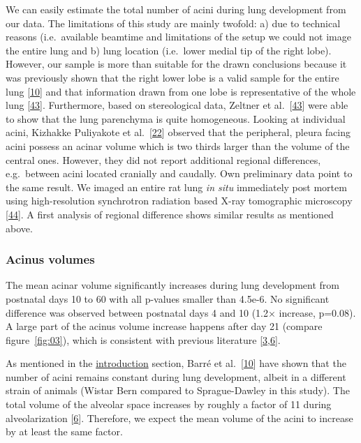 \documentclass[
  american,
]{article}
\begin{document}
We can easily estimate the total number of acini during lung development from our data.
The limitations of this study are mainly twofold: a) due to technical reasons (i.e.~available beamtime and limitations of the setup we could not image the entire lung and b) lung location (i.e.~lower medial tip of the right lobe).
However, our sample is more than suitable for the drawn conclusions because it was previously shown that the right lower lobe is a valid sample for the entire lung {[}\protect\hyperlink{ref-14OP85b2F}{10}{]} and that information drawn from one lobe is representative of the whole lung {[}\protect\hyperlink{ref-I9TmP6IU}{43}{]}.
Furthermore, based on stereological data, Zeltner et al.~{[}\protect\hyperlink{ref-I9TmP6IU}{43}{]} were able to show that the lung parenchyma is quite homogeneous.
Looking at individual acini, Kizhakke Puliyakote et al.~{[}\protect\hyperlink{ref-RGBeCf8v}{22}{]} observed that the peripheral, pleura facing acini possess an acinar volume which is two thirds larger than the volume of the central ones.
However, they did not report additional regional differences, e.g.~between acini located cranially and caudally.
Own preliminary data point to the same result.
We imaged an entire rat lung \emph{in situ} immediately post mortem using high-resolution synchrotron radiation based X-ray tomographic microscopy {[}\protect\hyperlink{ref-Zv1XcgAO}{44}{]}.
A first analysis of regional difference shows similar results as mentioned above.

\hypertarget{acinus-volumes}{%
\subsubsection{Acinus volumes}\label{acinus-volumes}}

The mean acinar volume significantly increases during lung development from postnatal days 10 to 60 with all p-values smaller than 4.5e-6.
No significant difference was observed between postnatal days 4 and 10 (1.2× increase, p=0.08).
A large part of the acinus volume increase happens after day 21 (compare figure~\ref{fig:03}), which is consistent with previous literature {[}\protect\hyperlink{ref-auNiE56G}{3},\protect\hyperlink{ref-wnl86DEM}{6}{]}.

As mentioned in the \protect\hyperlink{introduction}{introduction} section, Barré et al.~{[}\protect\hyperlink{ref-14OP85b2F}{10}{]} have shown that the number of acini remains constant during lung development, albeit in a different strain of animals (Wistar Bern compared to Sprague-Dawley in this study).
The total volume of the alveolar space increases by roughly a factor of 11 during alveolarization {[}\protect\hyperlink{ref-wnl86DEM}{6}{]}.
Therefore, we expect the mean volume of the acini to increase by at least the same factor.
\end{document}
